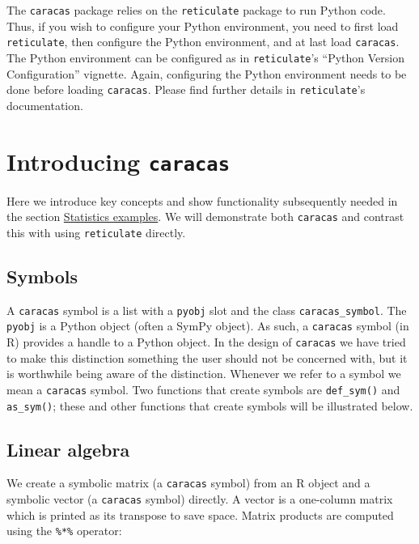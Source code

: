 The \texttt{caracas} package relies on the \texttt{reticulate} package to run Python code.
Thus, if you wish to configure your Python environment, you need to
first load \texttt{reticulate}, then configure the Python environment, and at
last load \texttt{caracas}.
The Python environment can be configured as
in \texttt{reticulate}'s ``Python Version Configuration'' vignette.
Again, configuring the Python environment needs to be done before
loading \texttt{caracas}.
Please find further details in \texttt{reticulate}'s documentation.

\hypertarget{introducing-caracas}{%
\section{\texorpdfstring{Introducing \texttt{caracas}}{Introducing caracas}}\label{introducing-caracas}}

Here we introduce key concepts and show functionality subsequently
needed in the section \protect\hyperlink{statistics-examples}{Statistics examples}.
We will demonstrate both \texttt{caracas} and
contrast this with using \texttt{reticulate} directly.

\hypertarget{symbols}{%
\subsection{Symbols}\label{symbols}}

A \texttt{caracas} symbol is a list with a \texttt{pyobj} slot and the class
\texttt{caracas\_symbol}. The \texttt{pyobj} is a Python object (often a SymPy
object). As such, a \texttt{caracas} symbol (in R) provides a handle to a
Python object. In the design of \texttt{caracas} we have tried to make
this distinction something the user should not be concerned with, but
it is worthwhile being aware of the distinction. Whenever we refer to
a symbol we mean a \texttt{caracas} symbol. Two functions that create
symbols are \texttt{def\_sym()} and \texttt{as\_sym()}; these and other functions that
create symbols will be illustrated below.

\hypertarget{linear-algebra}{%
\subsection{Linear algebra}\label{linear-algebra}}

We create a symbolic matrix (a \texttt{caracas} symbol) from an R object and
a symbolic vector (a \texttt{caracas} symbol) directly. A vector is a
one-column matrix which is printed as its transpose to save
space. Matrix products are computed using the \texttt{\%*\%} operator:

